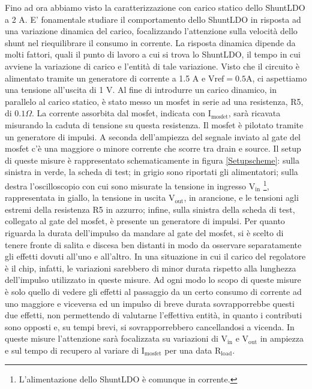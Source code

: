 Fino ad ora abbiamo visto la caratterizzazione con carico statico dello ShuntLDO a 2 A.
E' fonamentale studiare il comportamento dello ShuntLDO in risposta ad una variazione dinamica del carico, focalizzando l'attenzione sulla velocità dello shunt nel riequilibrare il consumo in corrente. 
La risposta dinamica dipende da molti fattori, quali il punto di lavoro a cui si trova lo ShuntLDO, il tempo in cui avviene la variazione di carico e l'entità di tale variazione. 
Visto che il circuito è alimentato tramite un generatore di corrente a 1.5 A e $\mathrm{Vref=0.5 A}$, ci aspettiamo una tensione all'uscita di 1 V.
Al fine di introdurre un carico dinamico, in parallelo al carico statico, è stato messo un mosfet in serie ad una resistenza, R5, di $0.1 \Omega$.
La corrente assorbita dal mosfet, indicata con $\mathrm{I_{mosfet}}$, sarà ricavata misurando la caduta di tensione su questa resistenza.
Il mosfet è pilotato tramite un generatore di impulsi.
A seconda dell'ampiezza del segnale inviato al gate del mosfet c'è una maggiore o minore corrente che scorre tra drain e source. 
Il setup di queste misure è rappresentato schematicamente in figura \ref{Setupscheme}: sulla sinistra in verde, la scheda di test; in grigio sono riportati gli alimentatori; sulla destra l'oscilloscopio con cui sono misurate la tensione in ingresso $\mathrm{V_{in}}$
\footnote{
L'alimentazione dello ShuntLDO è comunque in corrente.
}, rappresentata in giallo, la tensione in uscita $\mathrm{V_{out}}$, in arancione, e le tensioni agli estremi della resistenza R5 in azzurro; infine, sulla sinistra della scheda di test, collegato al gate del mosfet, è presente un generatore di impulsi. 
Per quanto riguarda la durata dell'impulso da mandare al gate del mosfet, si è scelto di tenere fronte di salita e discesa ben distanti in modo da osservare separatamente gli effetti dovuti all'uno e all'altro.
In una situazione in cui il carico del regolatore è il chip, infatti, le variazioni sarebbero di minor durata rispetto alla lunghezza dell'impulso utilizzato in queste misure.
Ad ogni modo lo scopo di queste misure è solo quello di vedere gli effetti al passaggio da un certo consumo di corrente ad uno maggiore e viceversa ed un impulso di breve durata sovrapporrebbe questi due effetti, non permettendo di valutarne l'effettiva entità, in quanto i contributi sono opposti e, su tempi brevi, si sovrapporrebbero cancellandosi a vicenda.
In queste misure l'attenzione sarà focalizzata su variazioni di $\mathrm{V_{in}}$ e $\mathrm{V_{out}}$ in ampiezza e sul tempo di recupero al variare di $\mathrm{I_{mosfet}}$ per una data $\mathrm{R_{load}}$.

